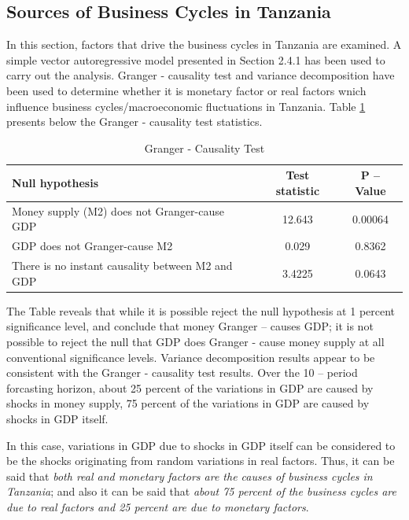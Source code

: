 \documentclass[12pt,a4paper,final]{article}
\begin{document}
\subsection{Sources of Business Cycles in Tanzania}

In this section, factors that drive the business cycles in Tanzania are examined. A simple vector autoregressive model presented in Section 2.4.1 has been used to carry out the analysis. Granger - causality test and variance decomposition have been used to determine whether it is monetary factor or real factors wnich influence business cycles/macroeconomic fluctuations in Tanzania. Table \ref{tabvar} presents below the Granger - causality test statistics.

\begin{table}[h]
\centering
\begin{small} 
\caption{Granger - Causality Test} 
\label{tabvar}
\begin{tabular}{l c c}
\toprule
\multicolumn{1}{l}{\textbf{Null hypothesis}} & \textbf{Test statistic} & \textbf{P -- Value}\\ 
 \midrule
Money supply (M2) does not Granger-cause GDP  & 12.643 & 0.00064\\
GDP does not Granger-cause  M2 & 0.029 & 0.8362\\
There is no instant causality between M2 and GDP & 3.4225 & 0.0643\\
\bottomrule
\end{tabular}
\end{small}
\end{table}

The Table reveals that while it is possible reject the null hypothesis at 1 percent significance level, and conclude that money Granger -- causes GDP; it is not possible to reject the null that GDP does Granger - cause money supply at all conventional significance levels. Variance decomposition results appear to be consistent with the Granger - causality test results. Over the 10 -- period forcasting horizon, about 25 percent of the variations in GDP are caused by shocks in money supply, 75 percent of the variations in GDP are caused by shocks in GDP itself. 

In this case, variations in GDP due to shocks in GDP itself can be considered to be the shocks originating from random variations in real factors.  Thus, it can be said that \textit{both real and monetary factors are the causes of business cycles in Tanzania}; and also it can be said that  \textit{about 75 percent of the business cycles are due to real factors and 25 percent are due to monetary factors}. 
\end{document}
